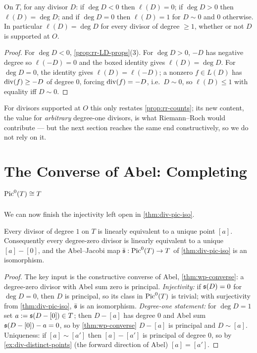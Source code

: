 \begin{proposition}
\label{prop:rr-dims}
On \(T\), for any divisor \(D\): if \(\deg D < 0\) then \(\ell(D) = 0\); if
\(\deg D > 0\) then \(\ell(D) = \deg D\); and if \(\deg D = 0\) then
\(\ell(D) = 1\) for \(D \sim 0\) and \(0\) otherwise. In particular
\(\ell(D) = \deg D\) for every divisor of degree \(\ge 1\), whether or not \(D\)
is supported at \(O\).
\end{proposition}

\begin{proof}
For \(\deg D < 0\), \cref{prop:rr-LD-props}(3). For \(\deg D > 0\), \(-D\) has
negative degree so \(\ell(-D) = 0\) and the boxed identity gives
\(\ell(D) = \deg D\). For \(\deg D = 0\), the identity gives
\(\ell(D) = \ell(-D)\); a nonzero \(f \in L(D)\) has \(\operatorname{div}(f) \ge -D\) of
degree \(0\), forcing \(\operatorname{div}(f) = -D\), i.e.\ \(D \sim 0\), so
\(\ell(D) \le 1\) with equality iff \(D \sim 0\).
\end{proof}

For divisors supported at \(O\) this only restates \cref{prop:rr-counts}; its new
content, the value for \emph{arbitrary} degree-one divisors, is what
Riemann--Roch would contribute --- but the next section reaches the same end
constructively, so we do not rely on it.

\section{The Converse of Abel: Completing \texorpdfstring{$\operatorname{Pic}^0(T) \cong T$}{Pic0(T) = T}}
\label{sec:rr-pic-completion}

We can now finish the injectivity left open in \cref{thm:div-pic-iso}.

\begin{corollary}
\label{cor:rr-degree-one}
Every divisor of degree \(1\) on \(T\) is linearly equivalent to a unique point
\([a]\). Consequently every degree-zero divisor is linearly equivalent to a unique
\([a] - [0]\), and the Abel--Jacobi map \(\bar{\mathfrak{s}} : \operatorname{Pic}^0(T) \to T\) of
\cref{thm:div-pic-iso} is an isomorphism.
\end{corollary}

\begin{proof}
The key input is the constructive converse of Abel, \cref{thm:wp-converse}: a
degree-zero divisor with Abel sum zero is principal. \emph{Injectivity:} if
\(\mathfrak{s}(D) = 0\) for \(\deg D = 0\), then \(D\) is principal, so its class in
\(\operatorname{Pic}^0(T)\) is trivial; with surjectivity from \cref{thm:div-pic-iso},
\(\bar{\mathfrak{s}}\) is an isomorphism. \emph{Degree-one statement:} for \(\deg D = 1\)
set \(a := \mathfrak{s}(D - [0]) \in T\); then \(D - [a]\) has degree \(0\) and Abel sum
\(\mathfrak{s}(D-[0]) - a = 0\), so by \cref{thm:wp-converse} \(D - [a]\) is principal and
\(D \sim [a]\). Uniqueness: if \([a] \sim [a']\) then \([a] - [a']\) is principal of
degree \(0\), so by \cref{ex:div-distinct-points} (the forward direction of Abel)
\([a] = [a']\).
\end{proof}

